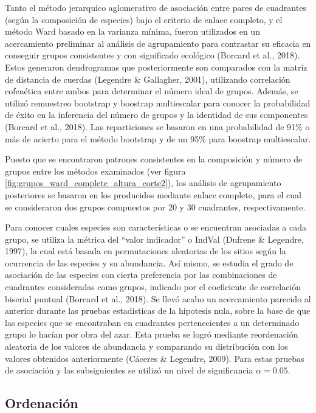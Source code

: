 \documentclass[11pt,]{article}
\begin{document}
Tanto el método jerarquico aglomerativo de asociación entre pares de
cuadrantes (según la composición de especies) bajo el criterio de enlace
completo, y el método Ward basado en la varianza mínima, fueron
utilizados en un acercamiento preliminar al análisis de agrupamiento
para contrastar su eficacia en conseguir grupos consistentes y con
significado ecológico (Borcard et al., 2018). Estos generaron
dendrogramas que posteriormente son comparados con la matriz de
distancia de cuerdas (Legendre \& Gallagher, 2001), utilizando
correlación cofenética entre ambos para determinar el número ideal de
grupos. Además, se utilizó remuestreo bootstrap y boostrap multiescalar
para conocer la probabilidad de éxito en la inferencia del número de
grupos y la identidad de sus componentes (Borcard et al., 2018). Las
reparticiones se basaron en una probabilidad de 91\% o más de acierto
para el método bootstrap y de un 95\% para boostrap multiescalar.

Puesto que se encontraron patrones consistentes en la composición y
número de grupos entre los métodos examinados (ver figura
\ref{fig:grupos_ward_complete_altura_corte2}), los análisis de
agrupamiento posteriores se basaron en los producidos mediante enlace
completo, para el cual se consideraron dos grupos compuestos por 20 y 30
cuadrantes, respectivamente.

Para conocer cuales especies son características o se encuentran
asociadas a cada grupo, se utiliza la métrica del ``valor indicador'' o
IndVal (Dufrene \& Legendre, 1997), la cual está basada en permutaciones
aleatorias de los sitios según la ocurrencia de las especies y su
abundancia. Así mismo, se estudia el grado de asociación de las especies
con cierta preferencia por las combinaciones de cuadrantes consideradas
como grupos, indicado por el coeficiente de correlación biserial puntual
(Borcard et al., 2018). Se llevó acabo un acercamiento parecido al
anterior durante las pruebas estadisticas de la hipotesis nula, sobre la
base de que las especies que se encontraban en cuadrantes pertenecientes
a un determinado grupo lo hacían por obra del azar. Esta prueba se logró
mediante reordenación aleatoria de los valores de abundancia y
comparando su distribución con los valores obtenidos anteriormente
(Cáceres \& Legendre, 2009). Para estas pruebas de asociación y las
subsiguientes se utilizó un nivel de significancia \(\alpha = 0.05\).

\subsection{Ordenación}\label{ordenaciuxf3n}
\end{document}
